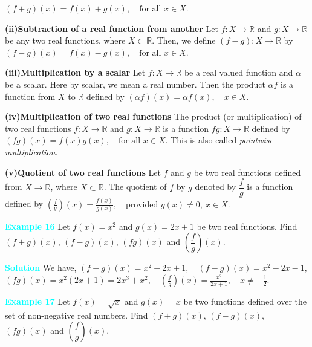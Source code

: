 \documentclass[11pt]{article}
\begin{document}
$(f+g)(x) = f(x) + g(x), \quad \text{for all } x \in X$.

\medskip

\noindent
\textbf{(ii)\quad Subtraction of a real function from another}  
Let $f : X \to \mathbb{R}$ and $g : X \to \mathbb{R}$ be any two real
functions, where $X \subset \mathbb{R}$. Then, we define
$(f-g) : X \to \mathbb{R}$ by
$(f-g)(x) = f(x) - g(x), \quad \text{for all } x \in X.$

\medskip

\noindent
\textbf{(iii)\quad Multiplication by a scalar}  
Let $f : X \to \mathbb{R}$ be a real valued function and $\alpha$ be a
scalar. Here by scalar, we mean a real number. Then the product
$\alpha f$ is a function from $X$ to $\mathbb{R}$ defined by
$(\alpha f)(x) = \alpha f(x), \quad x \in X.$

\medskip

\noindent
\textbf{(iv)\quad Multiplication of two real functions}  
The product (or multiplication) of two real functions
$f : X \to \mathbb{R}$ and $g : X \to \mathbb{R}$ is a function
$fg : X \to \mathbb{R}$ defined by
$(fg)(x) = f(x) g(x), \quad \text{for all } x \in X.$
This is also called \emph{pointwise multiplication}.

\medskip

\noindent
\textbf{(v)\quad Quotient of two real functions}  
Let $f$ and $g$ be two real functions defined from
$X \to \mathbb{R}$, where $X \subset \mathbb{R}$. The quotient of $f$ by
$g$ denoted by $\dfrac{f}{g}$ is a function defined by
$\left(\frac{f}{g}\right)(x) = \frac{f(x)}{g(x)}, \quad
\text{provided } g(x) \neq 0,\ x \in X.$

\medskip

\noindent\textcolor{cyan}{\textbf{Example 16}}  
Let $f(x) = x^{2}$ and $g(x) = 2x + 1$ be two real functions.
Find $(f+g)(x)$, $(f-g)(x)$, $(fg)(x)$ and
$\left(\dfrac{f}{g}\right)(x)$.

\medskip

\noindent\textcolor{cyan}{\textbf{Solution}}  
We have,
$(f+g)(x) = x^{2} + 2x + 1,
\quad
(f-g)(x) = x^{2} - 2x - 1,$
$(fg)(x) = x^{2}(2x+1) = 2x^{3} + x^{2},
\quad
\left(\frac{f}{g}\right)(x) = \frac{x^{2}}{2x+1},
\quad x \neq -\frac{1}{2}.$

\medskip

\noindent\textcolor{cyan}{\textbf{Example 17}}  
Let $f(x) = \sqrt{x}$ and $g(x) = x$ be two functions defined over the set
of non-negative real numbers. Find $(f+g)(x)$, $(f-g)(x)$, $(fg)(x)$ and
$\left(\dfrac{f}{g}\right)(x)$.
\end{document}
